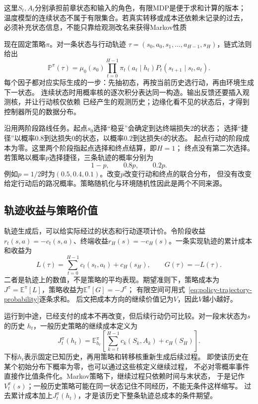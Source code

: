 这里$S_t,A_t$分别承担前章状态和输入的角色，有限MDP是便于求和计算的版本；
温度模型的连续状态不属于有限集合。若真实转移或成本还依赖未记录的过去，
必须补充状态信息，不能只靠给观测改名来获得Markov性质

现在固定策略$\pi$。对一条状态与行动轨迹
$\tau=(s_0,a_0,s_1,\ldots,a_{H-1},s_H)$，链式法则给出
\begin{equation}
  \mathbb P^\pi(\tau)
  =\mu_0(s_0)\prod_{t=0}^{H-1}
    \pi_t(a_t\mid h_t)P_t(s_{t+1}\mid s_t,a_t).
  \label{eq:policy-trajectory-probability}
\end{equation}
每个因子都对应实际生成的一步：先抽初态，再按当前历史选行动，再由环境生成下一状态。
连续状态时用概率核的逐次积分表达同一构造。输出反馈还要插入观测核，并让行动核仅依赖
已经产生的观测历史；边缘化看不见的状态后，才得到控制器所见的数据分布。

沿用两阶段路线任务。起点$s_0$选择“稳妥”会确定到达终端损失$2$的状态；
选择“捷径”以概率$0.8$到达损失$0$的状态，以概率$0.2$到达损失$6$的状态。
起点行动的阶段成本为零。这里两个阶段指起点选择和终点结算，即$H=1$；
终点没有第二次选择。若策略以概率$p$选择捷径，三条轨迹的概率分别为
\[
  1-p,\qquad 0.8p,\qquad 0.2p.
\]
例如$p=1/2$时为$(0.5,0.4,0.1)$。改变$p$改变行动和终点的联合分布，
但没有改变给定行动后的路况概率。策略随机化与环境随机性因此是两个不同来源。

\subsection{轨迹收益与策略价值}
\label{sec:policy-trajectory-return}

轨迹生成后，可以给实际经过的状态和行动逐项计价。令阶段收益
$r_t(s,a)=-c_t(s,a)$、终端收益$r_H(s)=-c_H(s)$。一条实现轨迹的累计成本和收益为
\begin{equation}
  L(\tau)=\sum_{t=0}^{H-1}c_t(s_t,a_t)+c_H(s_H),
  \qquad G(\tau)=-L(\tau).
  \label{eq:policy-trajectory-cost-return}
\end{equation}
二者是轨迹上的数值，不是策略的平均表现。期望准则下，策略成本为
$J^\pi=\mathbb E^\pi[L]$，策略收益为$\mathbb E^\pi[G]=-J^\pi$；
有限空间可用式~\eqref{eq:policy-trajectory-probability}逐条求和。
后文把成本方向的继续价值记为$V$，因此$V$越小越好。

运行到中途，已经支付的成本不再改变，但后续行动仍可比较。对一段末状态为$s$的历史
$h_t$，一般历史策略的继续成本定义为
\begin{equation}
  J_t^\pi(h_t)=
  \mathbb E^\pi_{h_t}
  \left[\sum_{k=t}^{H-1}c_k(S_k,A_k)+c_H(S_H)\right].
  \label{eq:decision-finite-policy-value}
\end{equation}
下标$h_t$表示固定已知历史，再用策略和转移核重新生成后续过程。
即使该历史在某个初始分布下概率为零，也可以通过这些核定义继续过程，
不必对零概率事件直接作比值条件化。Markov策略下，继续过程只依赖时间与末状态，
于是记作$V_t^\pi(s)$；一般历史策略可能在同一状态记住不同经历，不能无条件这样缩写。
过去累计成本加上$J_t^\pi(h_t)$，才是该历史下整条轨迹总成本的条件期望。

